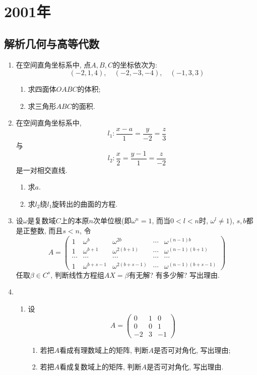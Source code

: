\documentclass[12pt,a4paper,openany]{book}
\begin{document}
\section{2001年}
\subsection{解析几何与高等代数}
\begin{enumerate}
\item 在空间直角坐标系中, 点$A,B,C$的坐标依次为:
\[
(-2, 1, 4), \quad (-2, -3, -4), \quad (-1, 3, 3)
\]
\begin{enumerate}
\item 求四面体$OABC$的体积;
\item 求三角形$ABC$的面积.
\end{enumerate}

\item 在空间直角坐标系中,
\[
l_1: \frac{x-a}{1} = \frac{y}{-2} = \frac{z}{3}
\]
与
\[
l_2: \frac{x}{2} = \frac{y-1}{1} = \frac{z}{-2}
\]
是一对相交直线.
\begin{enumerate}
\item 求$a$.
\item 求$l_2$绕$l_1$旋转出的曲面的方程.
\end{enumerate}

\item 设$\omega$是复数域$C$上的本原$n$次单位根(即$\omega^n = 1$, 而当$0 < l < n$时, $\omega^l \neq 1$), $s, b$都是正整数, 而且$s < n$, 令
\[
A = \begin{pmatrix}
1 & \omega^b & \omega^{2b} & \cdots & \omega^{(n-1)b} \\
1 & \omega^{b+1} & \omega^{2(b+1)} & \cdots & \omega^{(n-1)(b+1)} \\
\cdots & \cdots & \cdots & \cdots & \cdots \\
1 & \omega^{b+s-1} & \omega^{2(b+s-1)} & \cdots & \omega^{(n-1)(b+s-1)}
\end{pmatrix}
\]
任取$\beta \in C^s$, 判断线性方程组$AX = \beta$有无解? 有多少解? 写出理由.

\item 
\begin{enumerate}
\item 设
\[
A = \begin{pmatrix}
0 & 1 & 0 \\
0 & 0 & 1 \\
-2 & 3 & -1
\end{pmatrix}
\]
\begin{enumerate}
\item 若把$A$看成有理数域上的矩阵, 判断$A$是否可对角化, 写出理由;
\item 若把$A$看成复数域上的矩阵, 判断$A$是否可对角化, 写出理由.
\end{enumerate}


\end{enumerate}
\end{enumerate}
\end{document}
